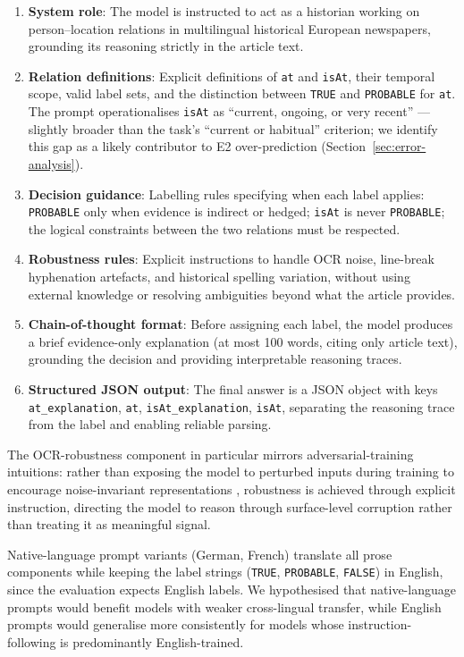 \documentclass[
]{ceurart}
\theoremstyle{definition}
\begin{document}
\begin{enumerate}[noitemsep]
  \item \textbf{System role}: The model is instructed to act as a historian working on person--location relations in multilingual historical European newspapers, grounding its reasoning strictly in the article text.
  \item \textbf{Relation definitions}: Explicit definitions of \texttt{at} and \texttt{isAt}, their temporal scope, valid label sets, and the distinction between \texttt{TRUE} and \texttt{PROBABLE} for \texttt{at}. The prompt operationalises \texttt{isAt} as ``current, ongoing, or very recent'' --- slightly broader than the task's ``current or habitual'' criterion; we identify this gap as a likely contributor to E2 over-prediction (Section~\ref{sec:error-analysis}).
  \item \textbf{Decision guidance}: Labelling rules specifying when each label applies: \texttt{PROBABLE} only when evidence is indirect or hedged; \texttt{isAt} is never \texttt{PROBABLE}; the logical constraints between the two relations must be respected.
  \item \textbf{Robustness rules}: Explicit instructions to handle OCR noise, line-break hyphenation artefacts, and historical spelling variation, without using external knowledge or resolving ambiguities beyond what the article provides.
  \item \textbf{Chain-of-thought format}: Before assigning each label, the model produces a brief evidence-only explanation (at most 100 words, citing only article text), grounding the decision and providing interpretable reasoning traces.
  \item \textbf{Structured JSON output}: The final answer is a JSON object with keys \texttt{at\_explanation}, \texttt{at}, \texttt{isAt\_explanation}, \texttt{isAt}, separating the reasoning trace from the label and enabling reliable parsing.
\end{enumerate}

The OCR-robustness component in particular mirrors adversarial-training intuitions: rather than exposing the model to perturbed inputs during training to encourage noise-invariant representations \citep{ali2025multilingual}, robustness is achieved through explicit instruction, directing the model to reason through surface-level corruption rather than treating it as meaningful signal.

Native-language prompt variants (German, French) translate all prose components while keeping the label strings (\texttt{TRUE}, \texttt{PROBABLE}, \texttt{FALSE}) in English, since the evaluation expects English labels.
We hypothesised that native-language prompts would benefit models with weaker cross-lingual transfer, while English prompts would generalise more consistently for models whose instruction-following is predominantly English-trained.
\end{document}
